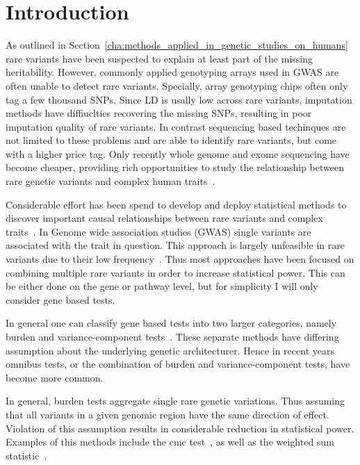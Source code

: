 \section{Introduction}
\label{sec:introduction}

As outlined in Section~\ref{cha:methods_applied_in_genetic_studies_on_humans} rare variants have been suspected to explain at least part of the missing heritability.
However, commonly applied genotyping arrays used in GWAS are often unable to detect rare variants.
Specially, array genotyping chips often only tag a few thousand SNPs.
Since LD is usally low across rare variants, imputation methods have diffiuclties recovering the missing SNPs, resulting in poor imputation quality of rare variants.
In contrast sequencing based techinques are not limited to these problems and are able to identify rare variants, but come with a higher price tag.
Only recently whole genome and exome sequencing have become cheaper, providing rich opportunities to study the relationship between rare genetic variants and complex human traits~\cite{Goodwin2016}.

Considerable effort has been spend to develop and deploy statistical methods to discover important causal relationships between rare variants and complex traits~\cite{Morris2010,Zeng2014,Daye2012,Manuscript2013}.
In Genome wide association studies (GWAS) single variants are associated with the trait in question.
This approach is largely unfeasible in rare variants due to their low frequency~\cite{Lee2014}.
Thus most approaches have been focused on combining multiple rare variants in order to increase statistical power.
This can be either done on the gene or pathway level, but for simplicity I will only consider gene based tests.

In general one can classify gene based tests into two larger categories, namely burden and variance-component tests~\cite{Lee2014}.
These separate methods have differing assumption about the underlying genetic architecturer.
Hence in recent years omnibus tests, or the combination of burden and variance-component tests, have become more common.

In general, burden tests aggregate single rare genetic variations.
Thus assuming that all variants in a given genomic region have the same direction of effect.
Violation of this assumption results in considerable reduction in statistical power.
Examples of this methods include the \acrfull{cmc} test~\cite{Li2008}, as well as the weighted sum statistic~\cite{Madsen2009}.

